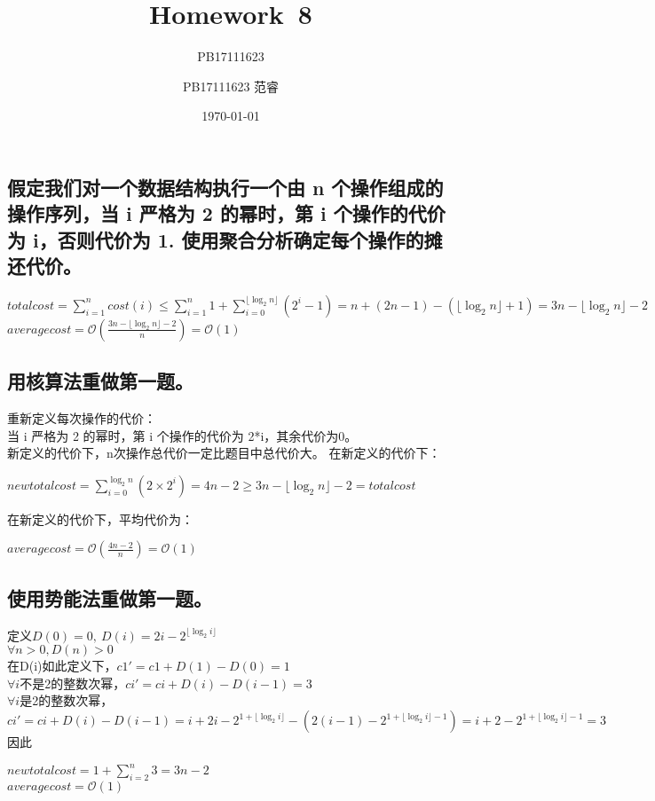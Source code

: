 \documentclass[UTF8]{ctexart}
\title{Homework\ 8}
\author{PB17111623}
\author{PB17111623 范睿}
\date{\today}
\begin{document}
\maketitle
\subsection{假定我们对一个数据结构执行一个由 n 个操作组成的操作序列，当 i 严格为 2 的幂时，第 i 个操作的代价为 i，否则代价为 1. 使用聚合分析确定每个操作的摊还代价。}
\begin{center}
$totalcost=\sum\limits_{i=1}^{n}cost(i)\leq \sum\limits_{i=1}^{n}1+\sum\limits_{i=0}^{\lfloor\log_2 n\rfloor}(2^i-1)=n+(2n-1)-(\lfloor\log_2 n\rfloor+1)=3n-\lfloor\log_2 n\rfloor-2$\\
$averagecost=\mathcal{O}(\frac{3n-\lfloor\log_2 n\rfloor-2}{n})=\mathcal{O}(1)$
\end{center}
\subsection{用核算法重做第一题。}
重新定义每次操作的代价：\\
当 i 严格为 2 的幂时，第 i 个操作的代价为 2*i，其余代价为0。\\
新定义的代价下，n次操作总代价一定比题目中总代价大。
在新定义的代价下：
\begin{center}
$newtotalcost=\sum\limits_{i=0}^{\log_2 n}(2\times 2^i)=4n-2 \geq 3n-\lfloor\log_2 n\rfloor-2=totalcost $
\end{center}
在新定义的代价下，平均代价为：\\
\begin{center}
$averagecost=\mathcal{O}(\frac{4n-2}{n})=\mathcal{O}(1)$
\end{center}
\subsection{使用势能法重做第一题。}
定义$D(0)=0,\ D(i)=2i-2^{\lfloor\log_2 i\rfloor}$\\
$\forall n >0, D(n)>0$\\
在D(i)如此定义下，$c1'=c1+D(1)-D(0)=1$\\
$\forall i$不是2的整数次幂，$ci'=ci+D(i)-D(i-1)=3$\\
$\forall i$是2的整数次幂，\\$ci'=ci+D(i)-D(i-1)=i+2i-2^{1+\lfloor\log_2 i\rfloor}-(2(i-1)-2^{1+\lfloor\log_2 i\rfloor-1})=i+2-2^{1+\lfloor\log_2 i\rfloor-1}=3$\\
因此
\begin{center}
$newtotalcost=1+\sum\limits_{i=2}^{n}3=3n-2$\\
$averagecost=\mathcal{O}(1)$
\end{center}
\end{document}
